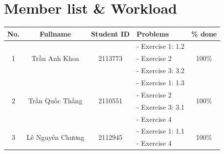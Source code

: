 \documentclass[a4paper, 11pt]{article}
\begin{document}
\section*{Member list \& Workload}
\begin{center}
    \begin{table}[h]
        \centering
        \begin{tabular}{|c|c|c|l|c|}
            \hline
            \textbf{No.}       & \textbf{Fullname}                 & \textbf{Student ID}      & \textbf{Problems} & \textbf{\% done} \\
            \hline
            \multirow{3}{*}{1} & \multirow{3}{*}{Trần Anh Khoa}    & \multirow{3}{*}{2113773} &
            - Exercise 1: 1.2  & \multirow{3}{*}{100\%}                                                                              \\
                               &                                   &                          & - Exercise 2      &                  \\
                               &                                   &                          & - Exercise 3: 3.2 &                  \\
            \hline
            \multirow{4}{*}{2} & \multirow{4}{*}{Trần Quốc Thắng}  & \multirow{4}{*}{2110551} &
            - Exercise 1: 1.3  & \multirow{4}{*}{100\%}                                                                              \\
                               &                                   &                          & - Exercise 2      &                  \\
                               &                                   &                          & - Exercise 3: 3.1 &                  \\
                               &                                   &                          & - Exercise 4      &                  \\
            \hline
            \multirow{3}{*}{3} & \multirow{3}{*}{Lê Nguyên Chương} & \multirow{3}{*}{2112945} &
            - Exercise 1: 1.1  & \multirow{3}{*}{100\%}                                                                              \\
                               &                                   &                          & - Exercise 4      &                  \\

\end{tabular}
\end{table}
\end{center}
\end{document}
